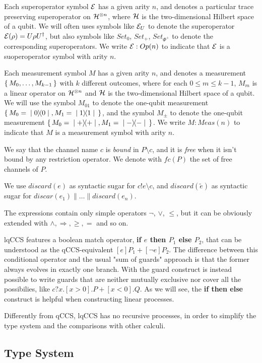 Each superoperator symbol $\mathcal{E}$ has a given arity $n$, and denotes a particular trace preserving superoperator on $\mathcal{H}^{\otimes n}$, where $\mathcal{H}$ is the two-dimensional Hilbert space of a qubit. We will often uses symbols like $\mathcal{E}_U$ to denote the superoperator $\mathcal{E}(\rho) = U \rho U^\dagger$, but also symbols like $Set_0$, $Set_+$, 
$Set_{\Phi^+}$ to denote the corresponding superoperators. We write $\mathcal{E}: Op(n)$ to indicate  that $\mathcal{E}$ is a suoperoperator symbol with arity $n$.

Each measurement symbol $M$ has a given arity $n$, and denotes a measurement $\set{M_0, \ldots, M_{k-1}}$ with $k$ different outcomes, where for each $0 \leq m \leq k-1$, $M_m$ is a linear operator on $\mathcal{H}^{\otimes n}$ and $\mathcal{H}$ is the two-dimensional Hilbert space of a qubit. We will use the symbol $M_{01}$ to denote the one-qubit measurement $\set{M_0 = \ket{0}\!\!\bra{0}, M_1=\ket{1}\!\!\bra{1}}$, and the symbol $M_\pm$ to denote the one-qubit measurement $\set{M_0 = \ket{+}\!\!\bra{+}, M_1 = \ket{-}\!\!\bra{-}}$. We write $M: Meas(n)$ to indicate  that $M$ is a measurement symbol with arity $n$.

We say that the channel name $c$ is \textit{bound} in $P\setminus c$, and it is \textit{free} when it isn't bound by any restriction operator. We denote with $fc(P)$ the set of free channels of $P$.

We use $discard(e)$ as syntactic sugar for $c!e \setminus c$, and $discard(\widetilde{e})$ as syntactic sugar for $discar(e_1)\parallel \ldots\parallel discard(e_n)$.

The expressions contain only simple operators $\neg$, $\vee$, $\leq$, but it can be obviously extended with $\wedge, \Rightarrow, \geq, =$ and so on.

lqCCS features a boolean match operator, \textbf{if $e$ then $P_1$ else $P_2$}, that can be understood as the qCCS-equivalent $[e]P_1 + [\neg e]P_2$. The difference between this conditional operator and the usual "sum of guards" approach is that the former always evolves in exactly one branch. With the guard construct is instead possible to write guards that are neither mutually exclusive nor cover all the possibilies, like $c?x.[x > 0].P + [x < 0].Q$. As we will see, the  \textbf{if then else} construct is helpful when constructing linear processes.

Differently from qCCS, lqCCS has no recursive processes, in order to simplify the type system and the comparisons with other calculi.


\subsection{Type System}


